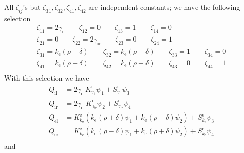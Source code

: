 All $\zeta_{ij}$'s but $\zeta_{31},\zeta_{32},\zeta_{41},\zeta_{42}$ are independent constants; we have the following selection 
\begin{gather*}
  \zeta_{11} = 2\gamma_\text{il} \qquad \zeta_{12} =0 \qquad \zeta_{13} = 1 \qquad \zeta_{14} = 0\\
  \zeta_{21} = 0 \qquad \zeta_{22} = 2\gamma_\text{ir} \qquad \zeta_{23} = 0 \qquad
\zeta_{24} = 1\\
  \zeta_{31} = k_\text{e}(\rho + \delta) \qquad \zeta_{32} = k_\text{e}(\rho - \delta) \qquad \zeta_{33} = 1 \qquad \zeta_{34} = 0\\
  \zeta_{41} = k_\text{e}(\rho - \delta) \qquad \zeta_{42} = k_\text{e}(\rho + \delta) \qquad \zeta_{43} = 0 \qquad \zeta_{44} = 1\\
\end{gather*}
With this selection we have
\begin{align*}
  Q_\text{il} &= 2\gamma_\text{il}\,K^\text{i}_{\gamma_\text{il}}\psi_1 + S^\text{i}_{\gamma_\text{il}}\psi_3 \\
  Q_\text{ir} &= 2\gamma_\text{ir}\,K^\text{i}_{\gamma_\text{ir}}\psi_2 + S^\text{i}_{\gamma_\text{ir}}\psi_4 \\
  Q_\text{el} &= K^{\text{e}}_{k_\text{e}} (k_\text{e} (\rho+\delta)\psi_1 + k_\text{e} (\rho-\delta)\psi_2) + S^{\text{e}}_{k_\text{e}}\psi_3 
 \\
  Q_\text{er} &= K^{\text{e}}_{k_\text{e}} (k_\text{e}(\rho-\delta)\psi_1 + k_\text{e}(\rho+\delta)\psi_2) + S^{\text{e}}_{k_\text{e}}\psi_4 \\
\end{align*}
and
